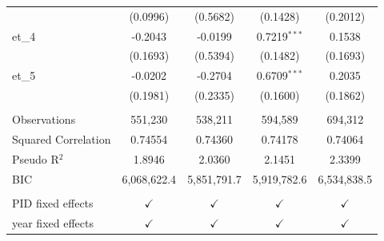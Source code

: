 \begin{tabular}{lcccc}
                       & (0.0996)                               & (0.5682)                              & (0.1428)                          & (0.2012)\\   
   et\_4               & -0.2043                                & -0.0199                               & 0.7219$^{***}$                    & 0.1538\\   
                       & (0.1693)                               & (0.5394)                              & (0.1482)                          & (0.1693)\\   
   et\_5               & -0.0202                                & -0.2704                               & 0.6709$^{***}$                    & 0.2035\\   
                       & (0.1981)                               & (0.2335)                              & (0.1600)                          & (0.1862)\\   
    \\
   Observations        & 551,230                                & 538,211                               & 594,589                           & 694,312\\  
   Squared Correlation & 0.74554                                & 0.74360                               & 0.74178                           & 0.74064\\  
   Pseudo R$^2$        & 1.8946                                 & 2.0360                                & 2.1451                            & 2.3399\\  
   BIC                 & 6,068,622.4                            & 5,851,791.7                           & 5,919,782.6                       & 6,534,838.5\\  
    \\
   PID fixed effects   & $\checkmark$                           & $\checkmark$                          & $\checkmark$                      & $\checkmark$\\   
   year fixed effects  & $\checkmark$                           & $\checkmark$                          & $\checkmark$                      & $\checkmark$\\   
   \bottomrule
\end{tabular}
\par\endgroup


